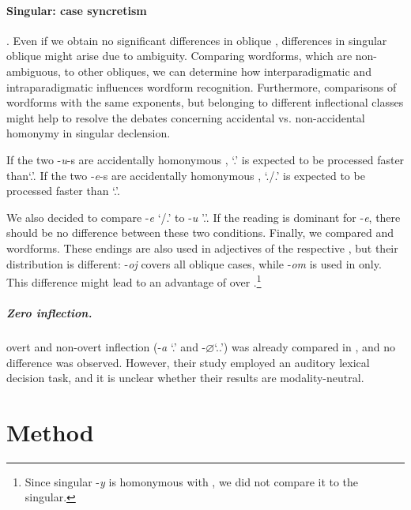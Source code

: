 \documentclass[output=paper, modfonts,newtxmath,hidelinks]{langscibook}
\begin{document}
\paragraph*{Singular: case syncretism}. Even if we obtain no significant differences in  oblique , differences in singular oblique  might arise due to ambiguity. Comparing  wordforms, which are non-ambiguous, to other obliques, we can determine how interparadigmatic and intraparadigmatic  influences wordform recognition. Furthermore, comparisons of wordforms with the same exponents, but belonging to different inflectional classes might help to  resolve the debates concerning accidental vs. non-accidental homo\-nymy in  singular declension.

If the two -\textit{u}-s are accidentally homonymous  \citep{wiese2004categories}, `\accc.\fem' is expected to be processed faster than`\datt.\masc'. If the two -\textit{e}-s are accidentally homonymous \citep{muller2004decomposing}, `\datt./\locc.\fem' is expected to be processed faster than `\locc.\masc'.

We also decided to compare -\textit{e} `\datt/\locc.\fem' to -\textit{u} '\datt.\masc'. If the  reading is dominant for -\textit{e}, there should be no difference between these two conditions. Finally, we compared  and   wordforms. These endings are also used in adjectives of the respective , but their distribution is different:  -\textit{oj} covers all oblique cases, while  -\textit{om} is used in  only. This difference might lead to an advantage of   over  .\footnote{ Since   singular -\textit{y} is homonymous with  , we did not compare it to the   singular.}

\subparagraph*{{Zero  inflection.}}  overt and non-overt  inflection (-\textit{a} `\nomm.\fem' and -\textit{$\varnothing$}`\nomm.\accc.\masc') was already compared in \citet{gor2017processing}, and no difference was observed. However, their study employed an auditory lexical decision task, and it is unclear whether their results are modality-neutral.

\section{Method}
\end{document}
